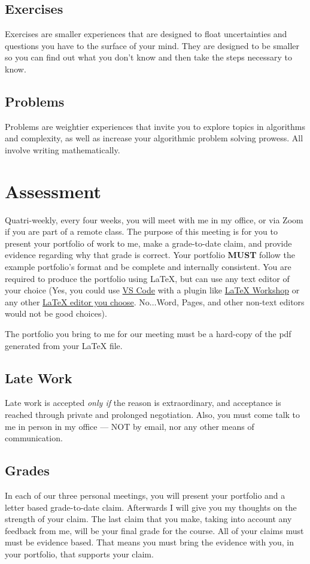 \documentclass[12pt]{amsart}
\begin{document}
\subsection{Exercises} Exercises are smaller experiences that are designed to float uncertainties and questions you have to the surface of your mind. They are designed to be smaller so you can find out what you don't know and then take the steps necessary to know.
\subsection{Problems} Problems are weightier experiences that invite you to explore topics in algorithms and complexity, as well as increase your algorithmic problem solving prowess. All involve writing mathematically.

\section{Assessment} Quatri-weekly, every four weeks, you will meet with me in my office, or via Zoom if you are part of a remote class. The purpose of this meeting is for you to present your portfolio of work to me, make a grade-to-date claim, and provide evidence regarding why that grade is correct. Your portfolio \textbf{MUST} follow the example portfolio's format and be complete and internally consistent. You are required to produce the portfolio using \LaTeX, but can use any text editor of your choice (Yes, you could use \href{https://code.visualstudio.com/download}{VS Code}  with a plugin like \href{https://marketplace.visualstudio.com/items?itemName=James-Yu.latex-workshop}{\LaTeX{} Workshop}  or any other \href{https://www.google.com/search?q=Best LaTex Editor}{\LaTeX{}  editor you choose}. No$\ldots$Word, Pages, and other non-text editors would not be good choices).

The portfolio you bring to me for our meeting must be a hard-copy of the pdf generated from your \LaTeX{} file.
\subsection{Late Work} Late work is accepted \textit{only if} the reason is extraordinary, and acceptance is reached through private and prolonged negotiation. Also, you must come talk to me in person in my office --- NOT by email, nor any other means of communication.

\subsection{Grades} In each of our three personal meetings, you will present your portfolio and a letter based grade-to-date claim. Afterwards I will give you my thoughts on the strength of your claim. The last claim that you make, taking into account any feedback from me, will be your final grade for the course. All of your claims must must be evidence based. That means you must bring the evidence with you, in your portfolio, that supports your claim. 
\end{document}
